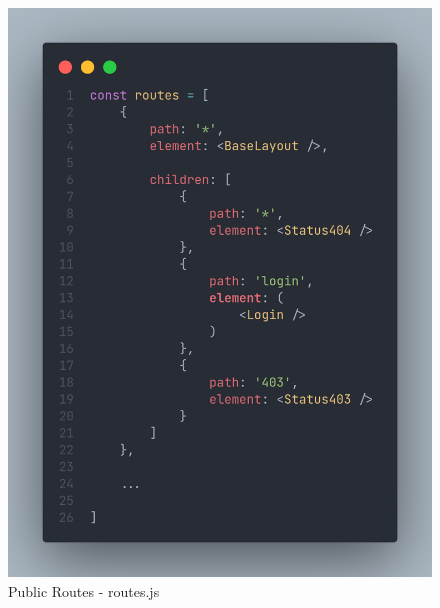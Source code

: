 \begin{justify}
        \begin{figure}[H]
            \centerline{\includegraphics[width=150mm,scale=1]{figures/implementation_and_testing/implementation/frontend/public_routes.png}}
            \caption{Public Routes - routes.js}
        \end{figure}


\end{justify}
